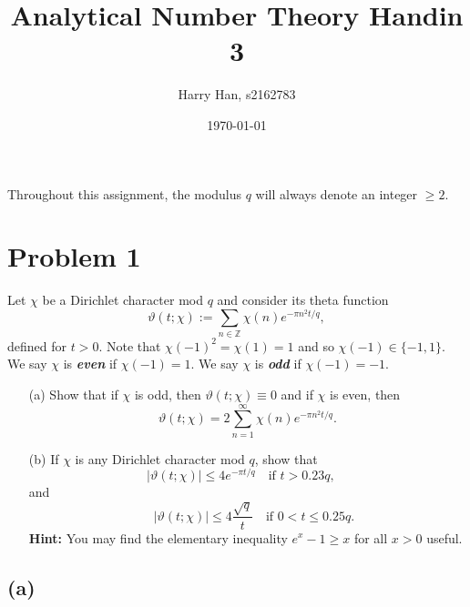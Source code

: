 \documentclass{article}
\title{Analytical Number Theory Handin 3}
\author{Harry Han, s2162783}
\date{\today}
\theoremstyle{definition}
\theoremstyle{definition}
\theoremstyle{remark}
\renewcommand{\emph}[1]{\textbf{\textit{#1}}}
\begin{document}
\maketitle


Throughout this assignment, the modulus $q$ will always denote an integer $\geq 2$.

\section*{Problem 1}
Let $\chi$ be a Dirichlet character mod $q$ and consider its theta function
\begin{equation*}
    \vartheta(t;\chi) := \sum_{n \in \mathbb{Z}} \chi(n) e^{-\pi n^2 t/q},
\end{equation*}
defined for $t > 0$. Note that $\chi(-1)^2 = \chi(1) = 1$ and so $\chi(-1) \in \{-1,1\}$. We say $\chi$ is \emph{even} if $\chi(-1) = 1$. We say $\chi$ is \emph{odd} if $\chi(-1) = -1$.

\begin{enumerate}
    \item[(a)] Show that if $\chi$ is odd, then $\vartheta(t;\chi) \equiv 0$ and if $\chi$ is even, then
    \begin{equation*}
        \vartheta(t;\chi) = 2 \sum_{n=1}^{\infty} \chi(n)e^{-\pi n^2 t/q}.
    \end{equation*}
    \item[(b)] If $\chi$ is any Dirichlet character mod $q$, show that
		\begin{equation}\label{theta_bound_large_t}
        |\vartheta(t;\chi)| \leq 4 e^{-\pi t/q} \quad \text{if } t > 0.23 q, \quad 
    \end{equation}
	and
	\begin{equation}
		\quad |\vartheta(t;\chi)| \leq 4 \frac{\sqrt{q}}{t} \quad \text{if } 0 < t \leq 0.25 q.
	\end{equation}
    \textbf{Hint:} You may find the elementary inequality $e^x - 1 \geq x$ for all $x > 0$ useful.
\end{enumerate}

\subsection*{(a)}
\end{document}

